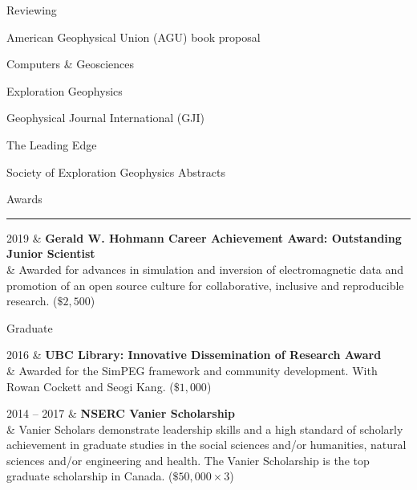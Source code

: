 \documentclass[a4paper, 11pt]{article}
\newcommand{\heading}[1]{
    \begin{minipage}[t]{\textwidth}
    \vspace{0.05cm}
    {\LARGE #1}\\
    \vspace{-0.24cm}
    \hrule
    \end{minipage}
    \vspace{0.05cm}

}
\newcommand{\subheading}[1]{
    \vspace{0.4cm}
    {\Large #1}\\
    \vspace{-0.2cm}
}
\begin{document}
\subheading{Reviewing}
\begin{mycompactitemize}
\item American Geophysical Union (AGU) book proposal
\item Computers \& Geosciences
\item Exploration Geophysics
\item Geophysical Journal International (GJI)
\item The Leading Edge
\item Society of Exploration Geophysics Abstracts
\end{mycompactitemize}



\heading{Awards}

\begin{entryright}
2019 & \textbf{Gerald W. Hohmann Career Achievement Award: Outstanding Junior Scientist} \\
& Awarded for advances in simulation and inversion of electromagnetic data and promotion of an open source culture for collaborative, inclusive and reproducible research. ($\$2,500$)
\end{entryright}

\subheading{Graduate}
\begin{entryright}
2016 & \textbf{UBC Library: Innovative Dissemination of Research Award}   \\
& Awarded for the SimPEG framework and community development. With Rowan Cockett and Seogi Kang. ($\$1,000$)
\end{entryright}

\begin{entryright}
2014 -- 2017 & \textbf{NSERC Vanier Scholarship} \\
& Vanier Scholars demonstrate leadership skills and a high standard of scholarly achievement in graduate studies in the social sciences and/or humanities, natural sciences and/or engineering and health. The Vanier Scholarship is the top graduate scholarship in Canada. ($ \$50,000 \times 3$)
\end{entryright}
\end{document}
